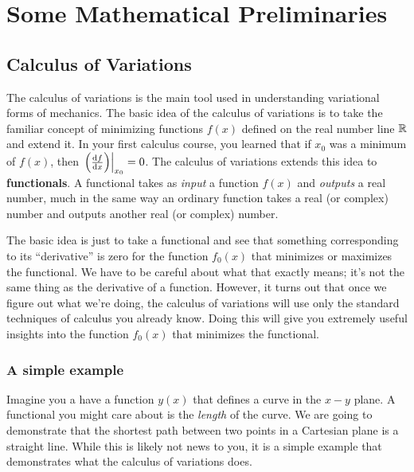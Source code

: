 \chapter{Some Mathematical Preliminaries}
\section{Calculus of Variations}
\label{sec:calc_var}

The calculus of variations is the main tool used in understanding variational forms of mechanics. The basic idea of the calculus of variations is to take the familiar concept of minimizing functions $f(x)$ defined on the real number line $\mathbb{R}$ and extend it. In your first calculus course, you learned that if $x_0$ was a minimum of $f(x)$, then $\eval{\qty(\dv{f}{x})}_{x_0} = 0$. 
The calculus of variations extends this idea to \textbf{functionals}. A functional takes as \emph{input} a function $f(x)$ and \emph{outputs} a real number, much in the same way an ordinary function takes a real (or complex) number and outputs another real (or complex) number.

The basic idea is just to take a functional and see that something corresponding to its ``derivative'' is zero for the function $f_0(x)$ that minimizes or maximizes the functional. We have to be careful about what that exactly means; it's not the same thing as the derivative of a function. However, it turns out that once we figure out what we're doing, the calculus of variations will use only the standard techniques of calculus you already know. Doing this will give you extremely useful insights into the function $f_0(x)$ that minimizes the functional. 


\subsection{A simple example}
Imagine you a have a function $y(x)$ that defines a curve in the $x-y$ plane. A functional you might care about is the \emph{length} of the curve. We are going to demonstrate that the shortest path between two points in a Cartesian plane is a straight line. While this is likely not news to you, it is a simple example that demonstrates what the calculus of variations does.

